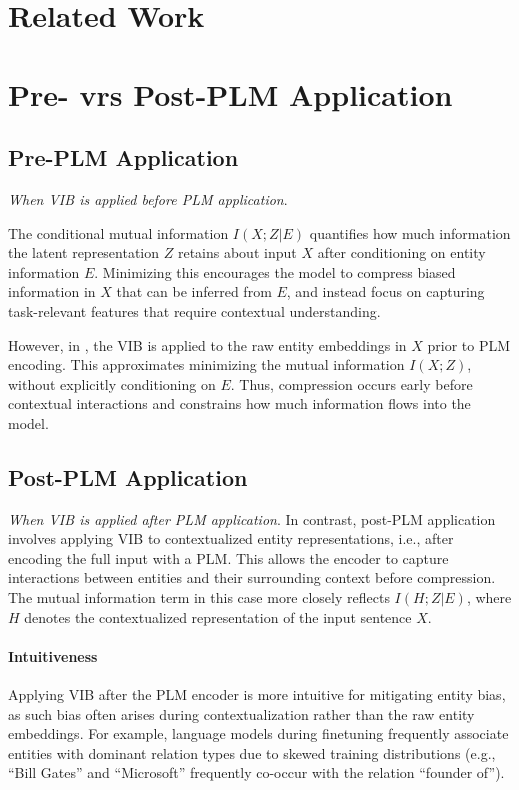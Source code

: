 \documentclass[11pt]{article}
\begin{document}
\section{Related Work}


\section{Pre- vrs Post-PLM Application}

\subsection*{Pre-PLM Application}
{\it When VIB is applied { before} PLM application}.

\noindent
The conditional mutual information $I(X;Z|E)$ quantifies how much information the latent representation $Z$ retains about input $X$ after conditioning on entity information $E$. Minimizing this encourages the model to compress biased information in $X$ that can be inferred from $E$, and instead focus on capturing task-relevant features that require contextual understanding.

However, in \cite{}, the VIB is applied to the raw entity embeddings in $X$ prior to PLM encoding. This approximates minimizing the mutual information $I(X;Z)$, without explicitly conditioning on $E$. Thus, compression occurs early before contextual interactions and constrains how much information flows into the model. 

\subsection*{Post-PLM Application}
{\it When VIB is applied { after} PLM application}.
\noindent
In contrast, post-PLM application involves applying VIB to contextualized entity representations, i.e., after encoding the full input with a PLM. This allows the encoder to capture interactions between entities and their surrounding context before compression. The mutual information term in this case more closely reflects $I(H;Z|E)$, where $H$ denotes the contextualized representation of the input sentence $X$. 

\paragraph{Intuitiveness} Applying VIB after the PLM encoder is more intuitive for mitigating entity bias, as such bias often arises during contextualization rather than the raw entity embeddings. For example, language models during finetuning frequently associate entities with dominant relation types due to skewed training distributions (e.g., ``Bill Gates'' and ``Microsoft'' frequently co-occur with the relation ``founder of''). 
\end{document}
